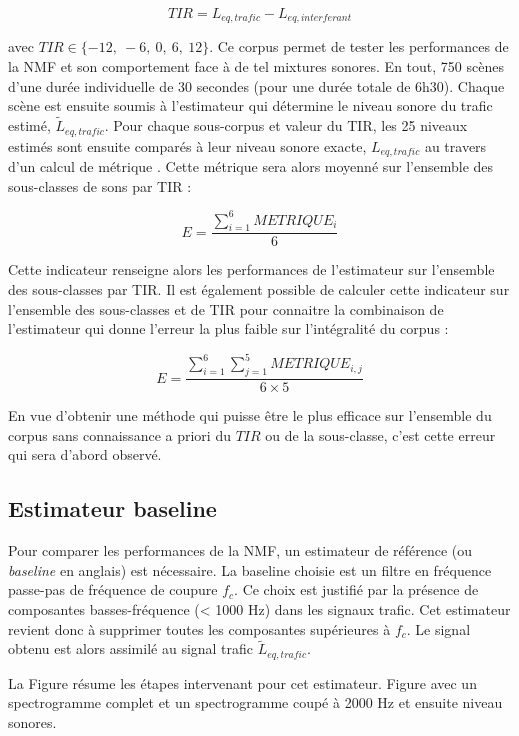 \begin{equation}
TIR = L_{eq,trafic} - L_{eq,interferant}
\end{equation}

avec $TIR \in \lbrace -12,~-6,~0,~6,~12 \rbrace$. Ce corpus permet de tester les performances de la NMF et son comportement face à de tel mixtures sonores. En tout, 750 scènes d'une durée individuelle de 30 secondes (pour une durée totale de 6h30).
Chaque scène est ensuite soumis à l'estimateur qui détermine le niveau sonore du trafic estimé, $\tilde{L}_{eq,trafic}$. Pour chaque sous-corpus et valeur du TIR, les 25 niveaux estimés sont ensuite comparés à leur niveau sonore exacte, $L_{eq,trafic}$ au travers d'un calcul de métrique .
Cette métrique sera alors moyenné sur l'ensemble des sous-classes de sons par TIR : 

\begin{equation}
E = \frac{\sum_{i = 1}^6 METRIQUE_{i}}{6}
\end{equation}

Cette indicateur renseigne alors les performances de l'estimateur sur l'ensemble des sous-classes par TIR. Il est également possible de calculer cette indicateur sur l'ensemble des sous-classes et de TIR pour connaitre la combinaison de l'estimateur qui donne l'erreur la plus faible sur l'intégralité du corpus : 

\begin{equation}
E = \frac{\sum_{i = 1}^6 \sum_{j = 1}^5 METRIQUE_{i,j}}{6 \times 5}
\end{equation}

En vue d'obtenir une méthode qui puisse être le plus efficace sur l'ensemble du corpus sans connaissance a priori du $TIR$ ou de la sous-classe, c'est cette erreur qui sera d'abord observé.

\subsection{Estimateur baseline}
Pour comparer les performances de la NMF, un estimateur de référence (ou \textit{baseline} en anglais) est nécessaire. La baseline choisie est un filtre en fréquence passe-pas de fréquence de coupure $f_c$. Ce choix est justifié par la présence de composantes basses-fréquence (< 1000 Hz) dans les signaux trafic. 
Cet estimateur revient donc à supprimer toutes les composantes supérieures à $f_c$. Le signal obtenu est alors assimilé au signal trafic $\tilde{L}_{eq,trafic}$. 

La Figure résume les étapes intervenant pour cet estimateur.
Figure avec un spectrogramme complet et un spectrogramme coupé à 2000 Hz et ensuite niveau sonores.

